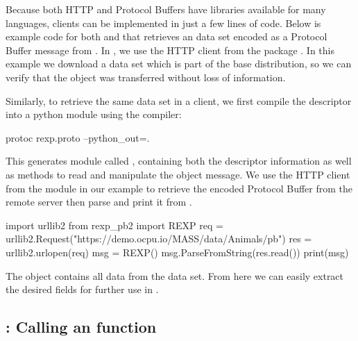 \documentclass[article]{jss}
\begin{document}
Because both HTTP and Protocol Buffers have libraries available for
many languages, clients can be implemented in just a few lines of
code. Below is example code for both  and
 that retrieves an  data set encoded as a
Protocol Buffer message from .  In , we use the
HTTP client from the  package \citep{httr}. In this example
we download a data set which is part of the base 
distribution, so we can verify that the object was transferred without
loss of information.
%
\begin{Schunk}
\end{Schunk}
%
Similarly, to retrieve the same data set in a  client, we first
compile the  descriptor into a python module
using the  compiler:
%
\begin{CodeChunk}
\begin{CodeInput}
protoc rexp.proto --python_out=.
\end{CodeInput}
\end{CodeChunk}
%
This generates  module called , containing
both the descriptor information as well as methods to read and
manipulate the  object message. We use the
HTTP client from the  module in our example to retrieve the
encoded Protocol Buffer from the remote server then parse and print it
from .
%
\begin{CodeChunk}
\begin{CodeInput}
import urllib2
from rexp_pb2 import REXP
req = urllib2.Request("https://demo.ocpu.io/MASS/data/Animals/pb")
res = urllib2.urlopen(req)
msg = REXP()
msg.ParseFromString(res.read())
print(msg)
\end{CodeInput}
\end{CodeChunk}
%
The  object contains all data from the  data
set. From here we can easily extract the desired fields for further
use in .

\subsection[HTTP POST: Calling an R function]{: Calling an  function}
\end{document}
